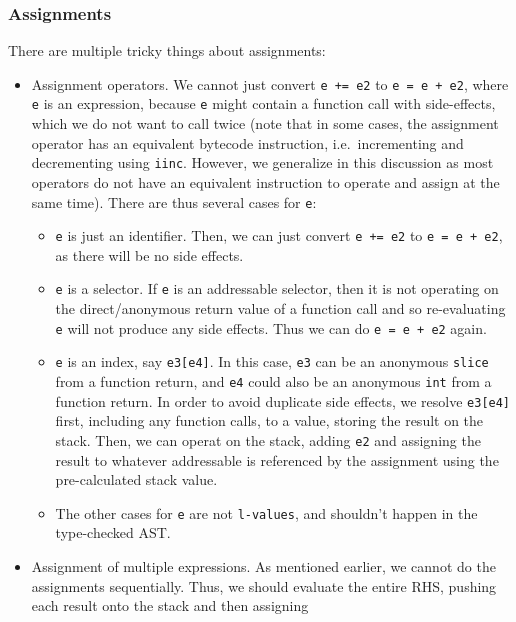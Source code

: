 \documentclass[11pt]{article}
\begin{document}
\subsubsection{Assignments}

There are multiple tricky things about assignments:

\begin{itemize}
\item Assignment operators. We cannot just convert \texttt{e += e2} to
  \texttt{e = e + e2}, where \texttt{e} is an expression, because
  \texttt{e} might contain a function call with side-effects, which we
  do not want to call twice (note that in some cases, the assignment
  operator has an equivalent bytecode instruction, i.e.\ incrementing
  and decrementing using \texttt{iinc}. However, we generalize in this
  discussion as most operators do not have an equivalent instruction
  to operate and assign at the same time). There are thus several
  cases for \texttt{e}:
  \begin{itemize}
  \item \texttt{e} is just an identifier. Then, we can just convert
    \texttt{e += e2} to \texttt{e = e + e2}, as there will be no side
    effects.
  \item \texttt{e} is a selector. If \texttt{e} is an addressable
    selector, then it is not operating on the direct/anonymous return
    value of a function call and so re-evaluating \texttt{e} will not
    produce any side effects. Thus we can do \texttt{e = e + e2}
    again.
  \item \texttt{e} is an index, say \texttt{e3[e4]}. In this case,
    \texttt{e3} can be an anonymous \texttt{slice} from a function
    return, and \texttt{e4} could also be an anonymous \texttt{int}
    from a function return. In order to avoid duplicate side effects,
    we resolve \texttt{e3[e4]} first, including any function calls, to
    a value, storing the result on the stack. Then, we can operat on
    the stack, adding \texttt{e2} and assigning the result to whatever
    addressable is referenced by the assignment using the
    pre-calculated stack value.
  \item The other cases for \texttt{e} are not \texttt{l-values}, and
    shouldn't happen in the type-checked AST.\@
  \end{itemize}
\item Assignment of multiple expressions. As mentioned earlier, we
  cannot do the assignments sequentially. Thus, we should evaluate the
  entire RHS, pushing each result onto the stack and then assigning

\end{itemize}
\end{document}
